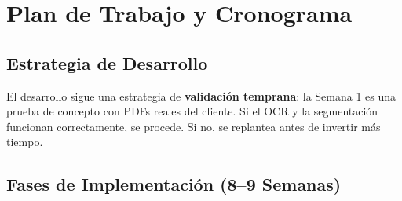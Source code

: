 \documentclass[11pt,a4paper]{article}
\begin{document}
\section{Plan de Trabajo y Cronograma}

\subsection{Estrategia de Desarrollo}

El desarrollo sigue una estrategia de \textbf{validación temprana}: la Semana 1 es una prueba de concepto con PDFs reales del cliente. Si el OCR y la segmentación funcionan correctamente, se procede. Si no, se replantea antes de invertir más tiempo.

\subsection{Fases de Implementación (8--9 Semanas)}
\end{document}
